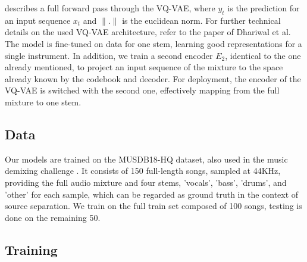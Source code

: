 \documentclass{llncs}
\begin{document}
describes a full forward pass through the VQ-VAE, where $ y_t $ is the prediction for an input sequence $x_t$ and $\|.\|$ is the euclidean norm. For further technical details on the used VQ-VAE architecture, refer to the paper of Dhariwal et al\cite{dhariwal2020jukebox}. The model is fine-tuned on data for one stem, learning good representations for a single instrument. In addition, we train a second encoder $E_2$, identical to the one already mentioned, to project an input sequence of the mixture to the space already known by the codebook and decoder. For deployment, the encoder of the VQ-VAE is switched with the second one, effectively mapping from the full mixture to one stem.




\subsection{Data}

Our models are trained on the MUSDB18-HQ \cite{MUSDB18HQ} dataset, also used in the music demixing challenge \cite{musicDemixing}. It consists of 150 full-length songs, sampled at 44KHz, providing the full audio mixture and four stems, 'vocals', 'bass', 'drums', and 'other' for each sample, which can be regarded as ground truth in the context of source separation. We train on the full train set composed of 100 songs, testing is done on the remaining 50. 

\subsection{Training}
\end{document}
